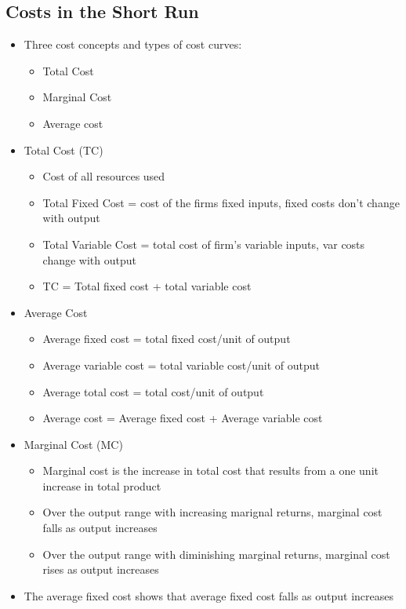 \documentclass[11pt]{article}
\begin{document}
\subsection{Costs in the Short Run}
\label{sec:orga67473c}
\begin{itemize}
\item Three cost concepts and types of cost curves:
\begin{itemize}
\item Total Cost
\item Marginal Cost
\item Average cost
\end{itemize}
\end{itemize}
\begin{itemize}
\item Total Cost (TC)
\begin{itemize}
\item Cost of all resources used
\item Total Fixed Cost = cost of the firms fixed inputs, fixed costs don't change with output
\item Total Variable Cost = total cost of firm's variable inputs, var costs change with output
\item TC = Total fixed cost + total variable cost
\end{itemize}
\item Average Cost
\begin{itemize}
\item Average fixed cost = total fixed cost/unit of output
\item Average variable cost = total variable cost/unit of output
\item Average total cost = total cost/unit of output
\item Average cost = Average fixed cost + Average variable cost
\end{itemize}
\item Marginal Cost (MC)
\begin{itemize}
\item Marginal cost is the increase in total cost that results from a one unit increase in total product
\item Over the output range with increasing marignal returns, marginal cost falls as output increases
\item Over the output range with diminishing marginal returns, marginal cost rises as output increases
\end{itemize}
\item The average fixed cost shows that average fixed cost falls as output increases

\end{itemize}
\end{document}
